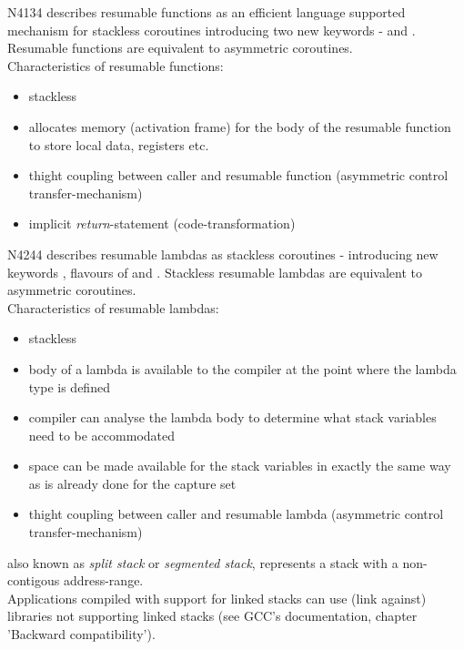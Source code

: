 N4134\cite{N4134} describes resumable functions as an efficient language
supported mechanism for stackless coroutines introducing two new keywords -
\await and \yield. Resumable functions are equivalent to asymmetric coroutines.\\
Characteristics of resumable functions:
\begin{itemize}
    \item stackless
    \item allocates memory (activation frame) for the body of the resumable
          function to store local data, registers etc.
    \item thight coupling between caller and resumable function (asymmetric
          control transfer-mechanism)
    \item implicit \textit{return}-statement\cite{N4134} (code-transformation)
\end{itemize}

N4244\cite{N4244} describes resumable lambdas as stackless coroutines -
introducing new keywords \resumable, flavours of \yield and \rlthis. Stackless
resumable lambdas are equivalent to asymmetric coroutines.\\
Characteristics of resumable lambdas:
\begin{itemize}
    \item stackless
    \item body of a lambda is available to the compiler at the point
          where the lambda type is defined
    \item compiler can analyse the lambda body to determine what stack
          variables need to be accommodated
    \item space can be made available for the stack variables in exactly the
          same way as is already done for the capture set
    \item thight coupling between caller and resumable lambda (asymmetric
          control transfer-mechanism)
\end{itemize}

also known as \textit{split stack}\cite{gccsplit} or
\textit{segmented stack}\cite{llvmseg}, represents a stack with a non-contigous
address-range.\\
Applications compiled with support for linked stacks can use (link against)
libraries not supporting linked stacks (see GCC's documentation\cite{gccsplit},
chapter 'Backward compatibility').
